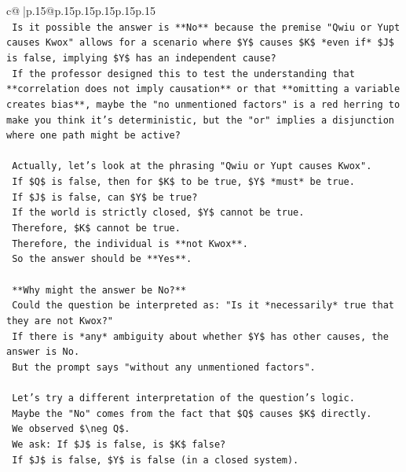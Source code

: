 \documentclass{article}
\begin{document}
{\begin{supertabular}{c@{$\;$}|p{.15\linewidth}@{}p{.15\linewidth}p{.15\linewidth}p{.15\linewidth}p{.15\linewidth}p{.15\linewidth}}
{{{\\ 
\texttt{        Is it possible the answer is **No** because the premise "Qwiu or Yupt causes Kwox" allows for a scenario where \$Y\$ causes \$K\$ *even if* \$J\$ is false, implying \$Y\$ has an independent cause?} \\
\texttt{        If the professor designed this to test the understanding that **correlation does not imply causation** or that **omitting a variable creates bias**, maybe the "no unmentioned factors" is a red herring to make you think it's deterministic, but the "or" implies a disjunction where one path might be active?} \\
\\ 
\texttt{        Actually, let's look at the phrasing "Qwiu or Yupt causes Kwox".} \\
\texttt{        If \$Q\$ is false, then for \$K\$ to be true, \$Y\$ *must* be true.} \\
\texttt{        If \$J\$ is false, can \$Y\$ be true?} \\
\texttt{        If the world is strictly closed, \$Y\$ cannot be true.} \\
\texttt{        Therefore, \$K\$ cannot be true.} \\
\texttt{        Therefore, the individual is **not Kwox**.} \\
\texttt{        So the answer should be **Yes**.} \\
\\ 
\texttt{        **Why might the answer be No?**} \\
\texttt{        Could the question be interpreted as: "Is it *necessarily* true that they are not Kwox?"} \\
\texttt{        If there is *any* ambiguity about whether \$Y\$ has other causes, the answer is No.} \\
\texttt{        But the prompt says "without any unmentioned factors".} \\
\\ 
\texttt{        Let's try a different interpretation of the question's logic.} \\
\texttt{        Maybe the "No" comes from the fact that \$Q\$ causes \$K\$ directly.} \\
\texttt{        We observed \$\textbackslash{}neg Q\$.} \\
\texttt{        We ask: If \$J\$ is false, is \$K\$ false?} \\
\texttt{        If \$J\$ is false, \$Y\$ is false (in a closed system).} \\
}}}
\end{supertabular}}
\end{document}
